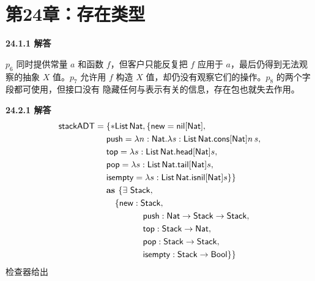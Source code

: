 \newpage
\section{第24章：存在类型}

\begin{taplauthorsolutionentrybox}
\label{sol:author:24.1.1}
\textbf{24.1.1 解答}

\(p_6\) 同时提供常量 \(a\) 和函数 \(f\)，但客户只能反复把 \(f\) 应用于
\(a\)，最后仍得到无法观察的抽象 \(X\) 值。\(p_7\) 允许用 \(f\) 构造
\(X\) 值，却仍没有观察它们的操作。\(p_8\) 的两个字段都可使用，但接口没有
隐藏任何与表示有关的信息，存在包也就失去作用。
\end{taplauthorsolutionentrybox}

\begin{taplauthorsolutionentrybox}
\label{sol:author:24.2.1}
\textbf{24.2.1 解答}
\[
\begin{aligned}
\taplterm{stackADT}={}&
\{*\tapltype{List}\,\tapltype{Nat},
\{\taplterm{new}=\taplterm{nil}[\tapltype{Nat}],\\
&\taplterm{push}=\lambda n:\tapltype{Nat}.
 \lambda s:\tapltype{List}\,\tapltype{Nat}.
 \taplterm{cons}[\tapltype{Nat}]n\,s,\\
&\taplterm{top}=\lambda s:\tapltype{List}\,\tapltype{Nat}.
 \taplterm{head}[\tapltype{Nat}]s,\\
&\taplterm{pop}=\lambda s:\tapltype{List}\,\tapltype{Nat}.
 \taplterm{tail}[\tapltype{Nat}]s,\\
&\taplterm{isempty}=\lambda s:\tapltype{List}\,\tapltype{Nat}.
 \taplterm{isnil}[\tapltype{Nat}]s\}\}\\
&\textbf{as }\{\exists\ \tapltype{Stack},\\
&\quad\{\taplterm{new}:\tapltype{Stack},\\
&\hspace{15mm}\taplterm{push}:\tapltype{Nat}\to\tapltype{Stack}\to\tapltype{Stack},\\
&\hspace{15mm}\taplterm{top}:\tapltype{Stack}\to\tapltype{Nat},\\
&\hspace{15mm}\taplterm{pop}:\tapltype{Stack}\to\tapltype{Stack},\\
&\hspace{15mm}
\taplterm{isempty}:\tapltype{Stack}\to\tapltype{Bool}\}\}
\end{aligned}
\]
检查器给出
\[
\begin{aligned}

\end{aligned}\]
\end{taplauthorsolutionentrybox}
